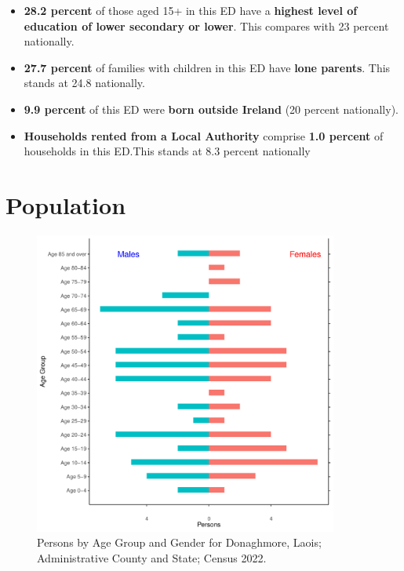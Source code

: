 \documentclass{article}
\begin{document}
\begin{itemize}
\item \textbf{28.2 percent} of those aged 15+ in this ED have a \textbf{highest level of education of lower secondary or lower}. This compares with 23 percent nationally. 

\item \textbf{27.7 percent} of families with children in this ED have \textbf{lone parents}. This stands at 24.8 nationally.

\item \textbf{9.9 percent} of this ED were \textbf{born outside Ireland} (20 percent nationally).

\item \textbf{Households rented from a Local Authority} comprise \textbf{1.0 percent} of households in this ED.This stands at 8.3 percent nationally

\end{itemize}

\pagebreak

\section{Population} 
\label{sect:Pop}

\begin{figure}[h]
	\centering
	\includegraphics[width = 100mm]{../figures/PyramidPlot.pdf}
	\caption{Persons by Age Group and Gender for Donaghmore, Laois; Administrative County and State; Census 2022.}
	\label{fig:2ae19629-1a6a-13a3-e055-000000000001}
	\end{figure}
\end{document}
